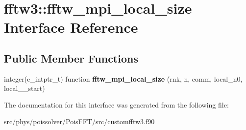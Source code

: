 \hypertarget{interfacefftw3_1_1fftw__mpi__local__size}{}\section{fftw3\+:\+:fftw\+\_\+mpi\+\_\+local\+\_\+size Interface Reference}
\label{interfacefftw3_1_1fftw__mpi__local__size}
\subsection*{Public Member Functions}
\begin{DoxyCompactItemize}
\item 
integer(c\+\_\+intptr\+\_\+t) function {\bfseries fftw\+\_\+mpi\+\_\+local\+\_\+size} (rnk, n, comm, local\+\_\+n0, local\+\_\+\_\+start)\hypertarget{interfacefftw3_1_1fftw__mpi__local__size_abe76d8968c9f710662373a6bca2a27da}{}\label{interfacefftw3_1_1fftw__mpi__local__size_abe76d8968c9f710662373a6bca2a27da}

\end{DoxyCompactItemize}


The documentation for this interface was generated from the following file\+:\begin{DoxyCompactItemize}
\item 
src/phys/poissolver/\+Pois\+F\+F\+T/src/customfftw3.\+f90\end{DoxyCompactItemize}
